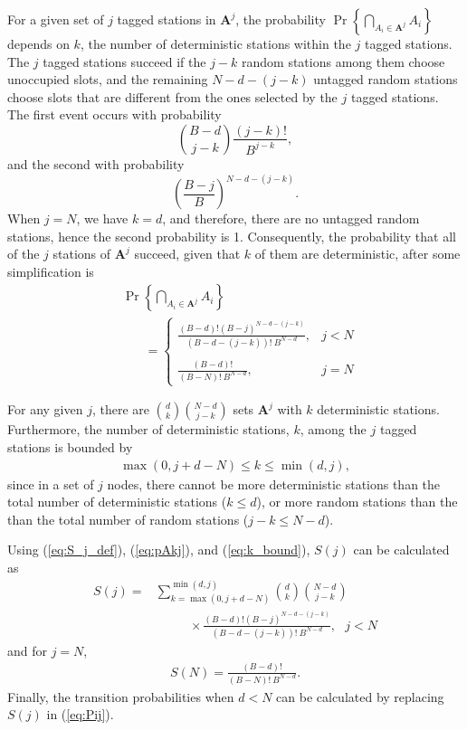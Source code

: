 \documentclass[journal]{IEEEtran}
\def\Abf{{\mathbf{A}}}
\newcommand{\pr}[1]{\Pr \left\{#1\right\}}
\begin{document}
{%
For a given set of $j$ tagged stations in $\Abf^{j}$, the probability $\pr{\bigcap_{A_i \in \Abf^{j}} A_i}$ depends on $k$, the number of deterministic stations within the $j$ tagged stations. The $j$ tagged stations succeed if the $j-k$ random stations among them choose unoccupied slots, and the remaining $N-d-(j-k)$ untagged random stations choose slots that are different from the ones selected by the $j$ tagged stations. The first event occurs with probability $$\binom{B-d}{j-k} \frac{(j-k)!}{B^{j-k}},$$ and the second with probability $$\left(\frac{B-j}{B} \right)^{N-d-(j-k)}.$$
When $j=N$, we have $k=d$, and therefore, there are no untagged random stations, hence the second probability is 1. Consequently, the probability that all of the $j$ stations of $\Abf^{j}$ succeed, given that $k$ of them are deterministic, after some simplification is
\begin{align}
\label{eq:pAkj}
&\pr{\bigcap_{A_i \in \Abf^{j}} A_i} \\
&~~~~~~~~= \left \{ \begin{array}{lr}
    \displaystyle \frac{(B-d)!(B-j)^{N-d-(j-k)}}{\left(B-d-(j-k)\right)!~B^{N-d}}, & j < N \\&\\
    \displaystyle \frac{(B-d)!}{(B-N)!~B^{N-d}}, & j = N
\end{array}
\right. \nonumber 
\end{align}

For any given $j$, there are $\binom{d}{k} \binom{N-d}{j-k}$ sets $\Abf^{j}$ with $k$ deterministic stations. Furthermore, the number of deterministic stations, $k$, among the $j$ tagged stations is bounded by
\begin{align}
\label{eq:k_bound}
\max(0,j+d-N) \leq k \leq \min(d,j),
\end{align}
since in a set of $j$ nodes, there cannot be more deterministic stations than the total number of deterministic stations ($k \leq d$), or more random stations than the than the total number of random stations ($j-k \leq N-d$). 


Using (\ref{eq:S_j_def}), (\ref{eq:pAkj}), and (\ref{eq:k_bound}), $S(j)$ can be calculated as
\begin{align}
\label{eq:S_j}
S(j) = &\sum_{k=\max(0,j+d-N)}^{\min(d,j)}   \binom{d}{k} \binom{N-d}{j-k}\\
 & ~~~~~~~~~~~~\times \frac{(B-d)!(B-j)^{N-d-(j-k)}}{\left(B-d-(j-k)\right)!~B^{N-d}}, ~~~ j < N \nonumber 
\end{align}
and for $j=N$,
\begin{align}
\label{eq:S_N}
S(N) = \frac{(B-d)!}{(B-N)!~B^{N-d}}.
\end{align}
Finally, the transition probabilities when $d<N$ can be calculated by replacing $S(j)$ in (\ref{eq:Pij}).


}
\end{document}
